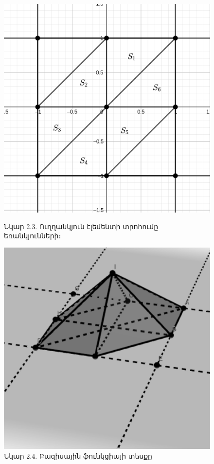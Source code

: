 \documentclass[fleqn, bachelor,subf,12pt,notitlepage]{article}
\begin{document}
\begin{figure}[H]
  \centering
  \begin{minipage}[b]{0.4\textwidth}
    \includegraphics[width=\textwidth]{images/two_var_courant_1}
    \captionsetup{labelformat=empty}
    \caption{Նկար 2.3. Ուղղանկյուն էլեմենտի տրոհումը եռանկյունների։}
  \end{minipage}
  \hfill
  \begin{minipage}[b]{0.4\textwidth}
    \includegraphics[width=\textwidth]{images/two_var_courant_2}
    \captionsetup{labelformat=empty}
    \caption{Նկար 2.4. Բազիսային ֆունկցիայի տեսքը}
  \end{minipage}
\end{figure}
\end{document}
